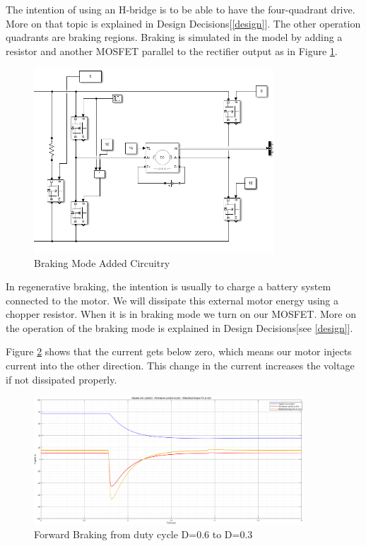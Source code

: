 The intention of using an H-bridge is to be able to have the four-quadrant drive. More on that topic is explained in Design Decisions[\ref{design}]. The other operation quadrants are braking regions. Braking is simulated in the model by adding a resistor and another MOSFET parallel to the rectifier output as in Figure \ref{fig:braking}.
\newpage
\begin{figure}[ht]
    \centering
    \includegraphics[width=0.8\textwidth]{matlab/braking_added.png}
    \caption{Braking Mode Added Circuitry}
    \label{fig:braking}
\end{figure}

In regenerative braking, the intention is usually to charge a battery system connected to the motor. We will dissipate this external motor energy using a chopper resistor. When it is in braking mode we turn on our MOSFET. More on the operation of the braking mode is explained in Design Decisions[see \ref{design}].

Figure \ref{fig:duty_braking} shows that the current gets below zero, which means our motor injects current into the other direction. This change in the current increases the voltage if not dissipated properly.
\begin{figure}[ht]
    \centering
    \includegraphics[width=0.9\textwidth]{matlab/braking D60_D30_v2.png}
    \caption{Forward Braking from duty cycle D=0.6 to D=0.3 }
    \label{fig:duty_braking}
\end{figure}